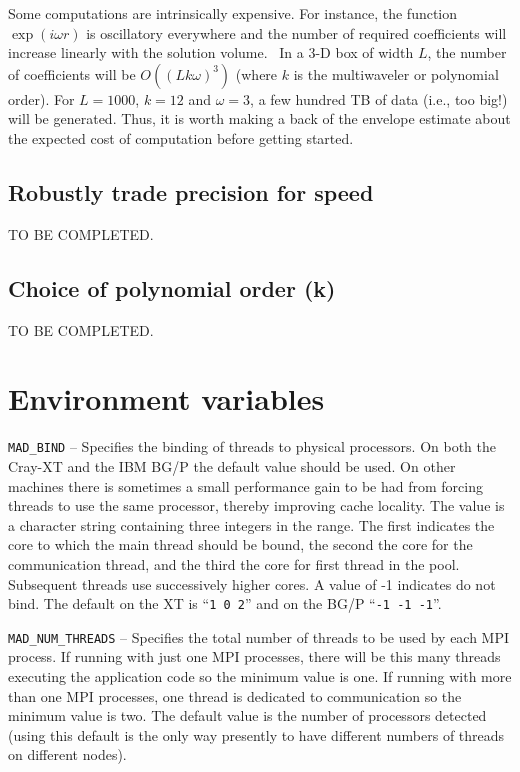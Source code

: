 \documentclass[letterpaper]{article}
\begin{document}
Some computations are intrinsically expensive. For instance, the function  $\exp (i\omega r)$ is oscillatory everywhere
and the number of required coefficients will increase linearly with the solution volume. \ In a 3-D box of width  $L$,
the number of coefficients will be  $O\left(\left(Lk\omega \right)^{3}\right)$ (where  $k$ is the multiwaveler or
polynomial order). For  $L=1000$,  $k=12$ and  $\omega =3$, a few hundred TB of data (i.e., too big!) will be
generated. Thus, it is worth making a back of the envelope estimate about the expected cost of computation before
getting started.

\subsection[Robustly trade precision for speed]{Robustly trade precision for speed}
TO BE COMPLETED.

\subsection{Choice of polynomial order (k)}
TO BE COMPLETED.

\section{Environment variables}
\texttt{MAD\_BIND} -- Specifies the binding of threads to physical processors. On both the Cray-XT and the IBM BG/P the
default value should be used. On other machines there is sometimes a small performance gain to be had from forcing
threads to use the same processor, thereby improving cache locality. The value is a character string containing three
integers in the range. The first indicates the core to which the main thread should be bound, the second the core for
the communication thread, and the third the core for first thread in the pool. Subsequent threads use successively
higher cores. A value of -1 indicates do not bind. The default on the XT is ``\texttt{1 0 2}{}'' and on the BG/P
``\texttt{{}-1 -1 -1}{}''.

\texttt{MAD\_NUM\_THREADS} -- Specifies the total number of threads to be used by each MPI process. If running with just
one MPI processes, there will be this many threads executing the application code so the minimum value is one. If
running with more than one MPI processes, one thread is dedicated to communication so the minimum value is two. The
default value is the number of processors detected (using this default is the only way presently to have different
numbers of threads on different nodes).
\end{document}
